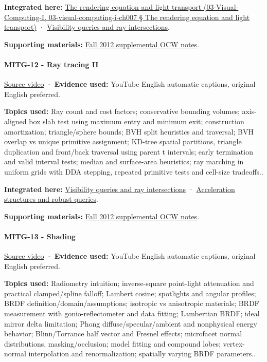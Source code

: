 \textbf{Integrated here:} \href{}{The rendering equation and light transport (03-Visual-Computing-I, 03-visual-computing-i-ch007 § The rendering equation and light transport)} · \hyperref[04-visual-computing-ii-ch028]{Visibility queries and ray intersections}.

\textbf{Supporting materials:} \href{https://ocw.mit.edu/courses/6-837-computer-graphics-fall-2012/pages/lecture-notes/}{Fall 2012 supplemental OCW notes}.

\paragraph{MITG-12 - Ray tracing II}\label{mitg-12---ray-tracing-ii}

\href{https://www.youtube.com/watch?v=mr_fHXW2YxE}{Source video} · \textbf{Evidence used:} YouTube English automatic captions, original English preferred.

\textbf{Topics used:} Ray count and cost factors; conservative bounding volumes; axis-aligned box slab test using maximum entry and minimum exit; construction amortization; triangle/sphere bounds; BVH split heuristics and traversal; BVH overlap vs unique primitive assignment; KD-tree spatial partitions, triangle duplication and front/back traversal using parent t intervals; early termination and valid interval tests; median and surface-area heuristics; ray marching in uniform grids with DDA stepping, repeated primitive tests and cell-size tradeoffs..

\textbf{Integrated here:} \hyperref[04-visual-computing-ii-ch028]{Visibility queries and ray intersections} · \hyperref[04-visual-computing-ii-ch029]{Acceleration structures and robust queries}.

\textbf{Supporting materials:} \href{https://ocw.mit.edu/courses/6-837-computer-graphics-fall-2012/pages/lecture-notes/}{Fall 2012 supplemental OCW notes}.

\paragraph{MITG-13 - Shading}\label{mitg-13---shading}

\href{https://www.youtube.com/watch?v=0xmeaXs5-ZU}{Source video} · \textbf{Evidence used:} YouTube English automatic captions, original English preferred.

\textbf{Topics used:} Radiometry intuition; inverse-square point-light attenuation and practical clamped/spline falloff; Lambert cosine; spotlights and angular profiles; BRDF definition/domain/assumptions; isotropic vs anisotropic materials; BRDF measurement with gonio-reflectometer and data fitting; Lambertian BRDF; ideal mirror delta limitation; Phong diffuse/specular/ambient and nonphysical energy behavior; Blinn/Torrance half vector and Fresnel effects; microfacet normal distributions, masking/occlusion; model fitting and compound lobes; vertex-normal interpolation and renormalization; spatially varying BRDF parameters..

